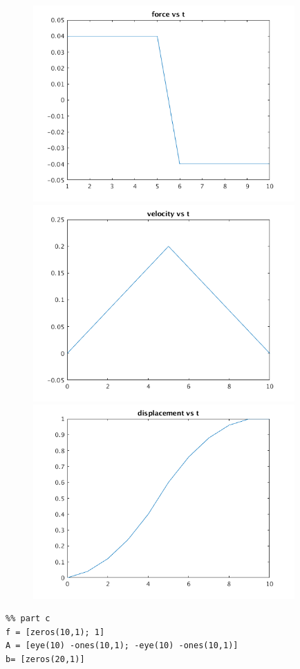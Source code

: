 \documentclass[12pt,letter]{article}
\begin{document}
\begin{enumerate}
\begin{enumerate}
    \begin{figure}[H]
    \centering
    \includegraphics[width=10cm]{q7/q7_c_1.png}
    \includegraphics[width=10cm]{q7/q7_c_2.png}
    \includegraphics[width=10cm]{q7/q7_c_3.png}
  \end{figure}

\begin{verbatim}
%% part c
f = [zeros(10,1); 1]
A = [eye(10) -ones(10,1); -eye(10) -ones(10,1)]
b= [zeros(20,1)]


\end{verbatim}
\end{enumerate}
\end{enumerate}
\end{document}
